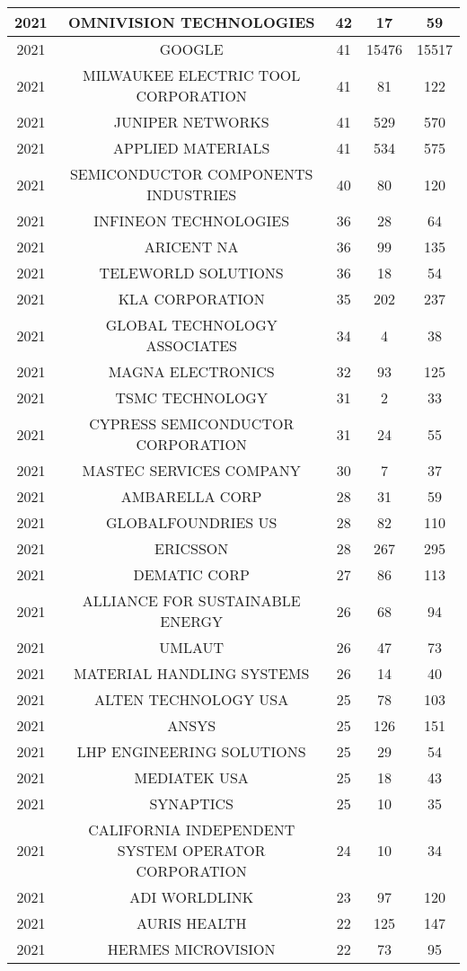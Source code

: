 \documentclass{article}%
\begin{document}
\begin{longtable}{c|c|c|c|c}
\hline%
2021&OMNIVISION TECHNOLOGIES&42&17&59\\%
\hline%
2021&GOOGLE&41&15476&15517\\%
\hline%
2021&MILWAUKEE ELECTRIC TOOL CORPORATION&41&81&122\\%
\hline%
2021&JUNIPER NETWORKS&41&529&570\\%
\hline%
2021&APPLIED MATERIALS&41&534&575\\%
\hline%
2021&SEMICONDUCTOR COMPONENTS INDUSTRIES&40&80&120\\%
\hline%
2021&INFINEON TECHNOLOGIES&36&28&64\\%
\hline%
2021&ARICENT NA&36&99&135\\%
\hline%
2021&TELEWORLD SOLUTIONS&36&18&54\\%
\hline%
2021&KLA CORPORATION&35&202&237\\%
\hline%
2021&GLOBAL TECHNOLOGY ASSOCIATES&34&4&38\\%
\hline%
2021&MAGNA ELECTRONICS&32&93&125\\%
\hline%
2021&TSMC TECHNOLOGY&31&2&33\\%
\hline%
2021&CYPRESS SEMICONDUCTOR CORPORATION&31&24&55\\%
\hline%
2021&MASTEC SERVICES COMPANY&30&7&37\\%
\hline%
2021&AMBARELLA CORP&28&31&59\\%
\hline%
2021&GLOBALFOUNDRIES US&28&82&110\\%
\hline%
2021&ERICSSON&28&267&295\\%
\hline%
2021&DEMATIC CORP&27&86&113\\%
\hline%
2021&ALLIANCE FOR SUSTAINABLE ENERGY&26&68&94\\%
\hline%
2021&UMLAUT&26&47&73\\%
\hline%
2021&MATERIAL HANDLING SYSTEMS&26&14&40\\%
\hline%
2021&ALTEN TECHNOLOGY USA&25&78&103\\%
\hline%
2021&ANSYS&25&126&151\\%
\hline%
2021&LHP ENGINEERING SOLUTIONS&25&29&54\\%
\hline%
2021&MEDIATEK USA&25&18&43\\%
\hline%
2021&SYNAPTICS&25&10&35\\%
\hline%
2021&CALIFORNIA INDEPENDENT SYSTEM OPERATOR CORPORATION&24&10&34\\%
\hline%
2021&ADI WORLDLINK&23&97&120\\%
\hline%
2021&AURIS HEALTH&22&125&147\\%
\hline%
2021&HERMES MICROVISION&22&73&95\\%

\end{longtable}
\end{document}
